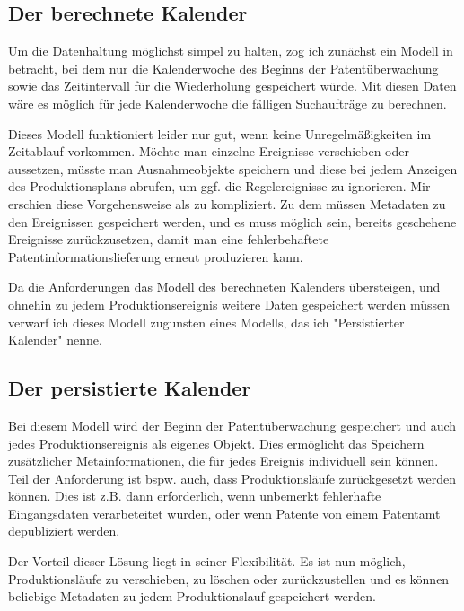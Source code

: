 \subsection{Der berechnete Kalender}
\label{ch:Lösungsansätze:Produktionsplan:BerechneterKalender}

Um die Datenhaltung möglichst simpel zu halten, zog ich zunächst ein Modell in
betracht, bei dem nur die Kalenderwoche des Beginns der Patentüberwachung sowie
das Zeitintervall für die Wiederholung gespeichert würde. Mit diesen Daten wäre
es möglich für jede Kalenderwoche die fälligen Suchaufträge zu berechnen.

Dieses Modell funktioniert leider nur gut, wenn keine Unregelmäßigkeiten im
Zeitablauf vorkommen. Möchte man einzelne Ereignisse verschieben oder aussetzen,
müsste man Ausnahmeobjekte speichern und diese bei jedem Anzeigen des
Produktionsplans abrufen, um ggf. die Regelereignisse zu ignorieren. Mir
erschien diese Vorgehensweise als zu kompliziert. Zu dem müssen Metadaten zu den
Ereignissen gespeichert werden, und es muss möglich sein, bereits geschehene
Ereignisse zurückzusetzen, damit man eine fehlerbehaftete
Patentinformationslieferung erneut produzieren kann.

Da die Anforderungen das Modell des berechneten Kalenders übersteigen, und
ohnehin zu jedem Produktionsereignis weitere Daten gespeichert werden müssen
verwarf ich dieses Modell zugunsten eines Modells, das ich "Persistierter
Kalender" nenne.

\subsection{Der persistierte Kalender}
\label{ch:Lösungsansätze:Produktionsplan:PersistierteKalender}

Bei diesem Modell wird der Beginn der Patentüberwachung gespeichert und auch
jedes Produktionsereignis als eigenes Objekt. Dies ermöglicht das
Speichern zusätzlicher Metainformationen, die für jedes Ereignis individuell
sein können. Teil der Anforderung ist bspw. auch, dass Produktionsläufe
zurückgesetzt werden können. Dies ist z.B. dann erforderlich, wenn unbemerkt
fehlerhafte Eingangsdaten verarbeteitet wurden, oder wenn Patente von einem
Patentamt depubliziert werden.

Der Vorteil dieser Lösung liegt in seiner Flexibilität. Es ist nun möglich,
Produktionsläufe zu verschieben, zu löschen oder zurückzustellen und es können
beliebige Metadaten zu jedem Produktionslauf gespeichert werden.

